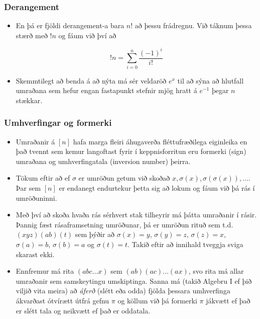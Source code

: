 \documentclass{beamer}
\begin{document}
\begin{frame}
\frametitle{Derangement}

\begin{itemize}

\item<1-> En þá er fjöldi derangement-a bara $n!$ að þessu frádregnu. Við táknum þessa stærð með $!n$ og fáum við því að

\[!n = \sum_{i = 0}^n \frac{(-1)^i}{i!}\]

\item<2-> Skemmtilegt að benda á að nýta má sér veldaröð $e^x$ til að sýna að hlutfall umraðana sem hefur engan fastapunkt stefnir mjög hratt á $e^{-1}$ þegar $n$ stækkar.

\end{itemize}

\end{frame}

\begin{frame}
\frametitle{Umhverfingar og formerki}

\begin{itemize}

\item<1-> Umraðanir á $[n]$ hafa marga fleiri áhugaverða fléttufræðilega eiginleika en það tvennt sem kemur langoftast fyrir í keppnisforritun eru formerki (sign) umraðana og umhverfingatala (inversion number) þeirra.

\item<2-> Tökum eftir að ef $\sigma$ er umröðun getum við skoðað $x, \sigma(x), \sigma(\sigma(x)), \dots$. Þar sem $[n]$ er endanegt endurtekur þetta sig að lokum og fáum við þá rás í umröðuninni.

\item<3-> Með því að skoða hvaða rás sérhvert stak tilheyrir má þátta umraðanir í rásir. Þannig fæst rásaframsetning umröðunar, þá er umröðun rituð sem t.d. $(x y z)(a b)(t)$ sem þýðir að $\sigma(x) = y$, $\sigma(y) = z$, $\sigma(z) = x$, $\sigma(a) = b$, $\sigma(b) = a$ og $\sigma(t) = t$. Takið eftir að innihald tveggja sviga skarast ekki.

\item<4-> Ennfremur má rita $(a b c \dots x)$ sem $(a b)(a c)\dots(a x)$, svo rita má allar umraðanir sem samskeytingu umskiptinga. Sanna má (takið Algebru I ef þið viljið vita meira) að \textit{áferð} (slétt eða odda) fjölda þessara umhverfinga ákvarðast ótvírætt útfrá gefnu $\pi$ og köllum við þá formerki $\pi$ jákvætt ef það er slétt tala og neikvætt ef það er oddatala.

\end{itemize}

\end{frame}
\end{document}
